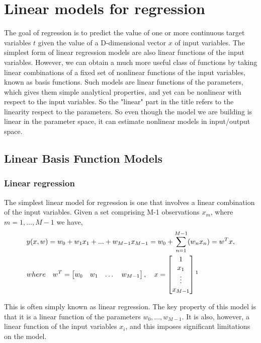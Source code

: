 \documentclass[main.tex]{subfiles}
\begin{document}
\section{Linear models for regression}
The goal of regression is to predict the value of one or more continuous target variables $t$ given the value of 
a D-dimensional vector $x$ of input variables. The simplest form of linear regression
models are also linear functions of the input variables. However, we can obtain a
much more useful class of functions by taking linear combinations of a fixed set of
nonlinear functions of the input variables, known as basis functions. Such models
are linear functions of the parameters, which gives them simple analytical properties,
and yet can be nonlinear with respect to the input variables. So the "linear" part in the title refers to the linearity respect to the parameters. So even though the model we are building is linear in the parameter space, it can estimate 
nonlinear models in input/output space.

\subsection{Linear Basis Function Models}
\subsubsection{Linear regression}
The simplest linear model for regression is one that involves a linear combination of
the input variables. Given a set comprising M-1 observations ${x_m}$, where $m = 1, ..., M-1$ we have,
\begin{equation} \label{eqn_linear_basis}
    \begin{split}
    &y(x,w) = w_0+w_1x_1+...+w_{M-1}x_{M-1} = w_0+\sum_{n=1}^{M-1}(w_nx_n) = w^{T}x, \\
    &
    where \quad w^T=\begin{bmatrix}w_0 & w_1 & \dots & w_{M-1}\end{bmatrix},\quad
    x=\begin{bmatrix}1\\ x_1 \\ \vdots \\x_{M-1}\end{bmatrix}\footnotemark
    \end{split}
\end{equation}

This is often simply known as linear regression. The key
property of this model is that it is a linear function of the parameters $w_0, ..., w_{M-1}$. It is
also, however, a linear function of the input variables $x_i$, and this imposes significant limitations on the model.
\end{document}
